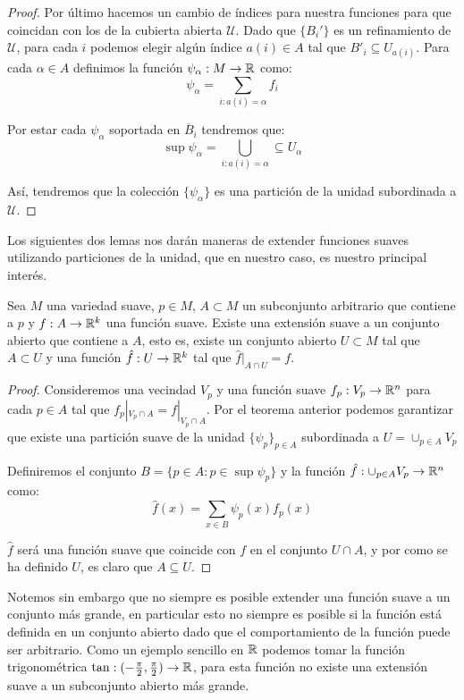 \begin{proof}
	Por último hacemos un cambio de índices para nuestra funciones para que coincidan con los de la cubierta abierta $\mathcal{U}$. Dado que $\{B_i'\}$ es un refinamiento de $\mathcal{U}$, para cada $i$ podemos elegir algún índice $a(i) \in A$ tal que $B'_i \subseteq U_{a(i)}$. Para cada $\alpha \in A$ definimos la función $\psi_\alpha: M \to \mathbb{R}$ como:
	\[
		\psi_\alpha = \sum_{i : a(i) = \alpha} f_i
	\]

	Por estar cada $\psi_\alpha$ soportada en $\overline{B}_{i}$ tendremos que:
	\[
		\sup \psi_{\alpha} = \bigcup_{i: a(i)=\alpha} \subseteq U_\alpha
	\]

	Así, tendremos que la colección $\{\psi_{\alpha}\}$ es una partición de la unidad subordinada a $\mathcal{U}$.
\end{proof}

Los siguientes dos lemas nos darán maneras de extender funciones suaves utilizando particiones de la unidad, que en nuestro caso, es nuestro principal interés.

\begin{lemma}
	Sea $M$ una variedad suave, $p \in M$, $A \subset M$ un subconjunto arbitrario que contiene a $p$ y $f: A \to \mathbb{R}^{k}$ una función suave. Existe una extensión suave a un conjunto abierto que contiene a $A$, esto es, existe un conjunto abierto $U \subset M$ tal que $A \subset U$ y una función $\hat{f}: U \to \mathbb{R}^{k}$ tal que $\hat{f}|_{A \cap U} = f$.
\end{lemma}

\begin{proof}
	Consideremos una vecindad $V_p$ y una función suave $f_p: V_p \to \mathbb{R}^n$ para cada $p \in A$ tal que $f_{p}|_{V_p \cap A} = f|_{V_p \cap A}$. Por el teorema anterior podemos garantizar que existe una partición suave de la unidad $\{\psi_{p}\}_{p \in A}$ subordinada a $U=\cup_{p \in A}V_p$

	Definiremos el conjunto $B = \{p \in A: p \in \sup \psi_p\}$ y la función $\hat{f}: \cup_{p \in A} V_p \to \mathbb{R}^n$ como:
	\[
		\hat{f}(x) = \sum_{x \in B} \psi_p(x)f_p(x)
	\]

	$\hat{f}$ será una función suave que coincide con $f$ en el conjunto $U \cap A$, y por como se ha definido $U$, es claro que $A \subseteq U$.
\end{proof}

Notemos sin embargo que no siempre es posible extender una función suave a un conjunto más grande, en particular esto no siempre es posible si la función está definida en un conjunto abierto dado que el comportamiento de la función puede ser arbitrario. Como un ejemplo sencillo en $\mathbb{R}$ podemos tomar la función trigonométrica $\tan: (-\frac{\pi}{2}, \frac{\pi}{2}) \to \mathbb{R}$, para esta función no existe una extensión suave a un subconjunto abierto más grande.


